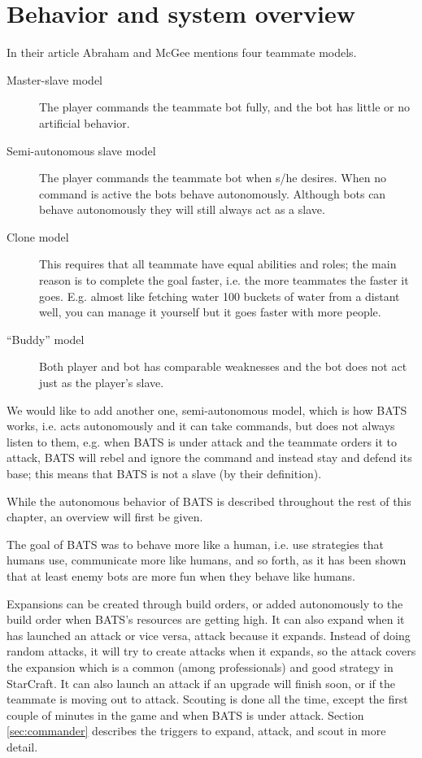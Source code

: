 \section{Behavior and system overview}
In their article\cite{abraham10} Abraham and McGee mentions four teammate models.
\begin{description}
	\item[Master-slave model] The player commands the teammate bot fully, and the bot has little or no artificial behavior.
	\item[Semi-autonomous slave model] The player commands the teammate bot when s/he desires. When no command is active the bots behave autonomously. Although bots can behave autonomously they will still always act as a slave.
	\item[Clone model] This requires that all teammate have equal abilities and roles; the main reason is to complete the goal faster, i.e. the more teammates the faster it goes. E.g. almost like fetching water 100 buckets of water from a distant well, you can manage it yourself but it goes faster with more people.
	\item[“Buddy” model] Both player and bot has comparable weaknesses and the bot does not act just as the player’s slave.
\end{description}
We would like to add another one, semi-autonomous model, which is how BATS works, i.e. acts autonomously and it can take commands, but does not always listen to them, e.g. when BATS is under attack and the teammate orders it to attack, BATS will rebel and ignore the command and instead stay and defend its base; this means that BATS is not a slave (by their definition).

While the autonomous behavior of BATS is described throughout the rest of this chapter, an overview will first be given.

The goal of BATS was to behave more like a human, i.e. use strategies that humans use, communicate more like humans, and so forth, as it has been shown that at least enemy bots are more fun when they behave like humans\cite{soni08}.



Expansions can be created through build orders, or added autonomously to the build order when BATS's resources are getting high. It can also expand when it has launched an attack or vice versa, attack because it expands. Instead of doing random attacks, it will try to create attacks when it expands, so the attack covers the expansion which is a common (among professionals) and good strategy in StarCraft\cite{day9}. It can also launch an attack if an upgrade will finish soon, or if the teammate is moving out to attack. Scouting is done all the time, except the first couple of minutes in the game and when BATS is under attack. Section \ref{sec:commander}  describes the triggers to expand, attack, and scout in more detail.

